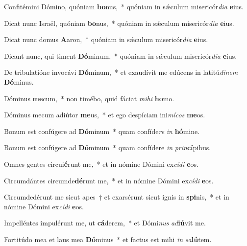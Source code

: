 \item Confitémini Dómino, quóniam \textbf{bo}nus,~* quóniam in sǽculum misericór\textit{dia} \textbf{e}ius.

\item Dicat nunc Israël, quóniam \textbf{bo}nus,~* quóniam in sǽculum misericór\textit{dia} \textbf{e}ius.

\item Dicat nunc domus \textbf{A}aron,~* quóniam in sǽculum misericór\textit{dia} \textbf{e}ius.

\item Dicant nunc, qui timent \textbf{Dó}minum,~* quóniam in sǽculum misericór\textit{dia} \textbf{e}ius.

\item De tribulatióne invocávi \textbf{Dó}minum,~* et exaudívit me edúcens in latitú\textit{dinem} \textbf{Dó}minus.

\item Dóminus \textbf{me}cum,~* non timébo, quid fáciat \textit{mihi} \textbf{ho}mo.

\item Dóminus mecum adiútor \textbf{me}us,~* et ego despíciam ini\textit{mícos} \textbf{me}os.

\item Bonum est confúgere ad \textbf{Dó}minum~* quam confíde\textit{re} \textit{in} \textbf{hó}mine.

\item Bonum est confúgere ad \textbf{Dó}minum~* quam confídere \textit{in} \textit{prin}\textbf{cí}pibus.

\item Omnes gentes circui\textbf{é}runt me,~* et in nómine Dómini ex\textit{cídi} \textbf{e}os.

\item Circumdántes circumde\textbf{dé}runt me,~* et in nómine Dómini ex\textit{cídi} \textbf{e}os.

\item Circumdedérunt me sicut apes~† et exarsérunt sicut ignis in \textbf{spi}nis,~* et in nómine Dómini ex\textit{cídi} \textbf{e}os.

\item Impelléntes impulérunt me, ut \textbf{cá}derem,~* et Dómi\textit{nus} \textit{ad}\textbf{iú}vit me.

\item Fortitúdo mea et laus mea \textbf{Dó}minus~* et factus est mihi \textit{in} \textit{sa}\textbf{lú}tem.

